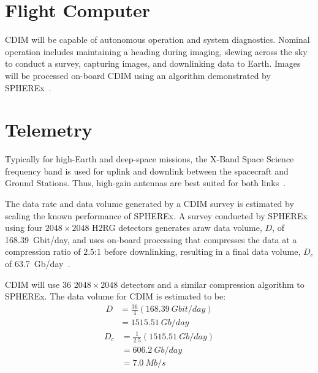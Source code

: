 \documentclass{ws-jai}
\begin{document}
\section{Flight Computer}
CDIM will be capable of autonomous operation and system diagnostics.
Nominal operation includes maintaining a heading during imaging, slewing across the sky to conduct a survey, capturing images, and downlinking data to Earth.
Images will be processed on-board CDIM using an algorithm demonstrated by SPHEREx~\cite{spherexTelemetry2016}.

\section{Telemetry}
\label{sec:telemetry}
Typically for high-Earth and deep-space missions, the X-Band Space Science frequency band is used for uplink and downlink between the spacecraft and Ground Stations.
Thus, high-gain antennas are best suited for both links~\cite{smad2015}.

The data rate and data volume generated by a CDIM survey is estimated by scaling the known performance of SPHEREx.
A survey conducted by SPHEREx using four $2048\times2048$ H2RG detectors generates araw data volume, $D$, of \SI{168.39}{Gbit/day}, and uses on-board processing that compresses the data at a compression ratio of $2.5$:$1$ before downlinking, resulting in a final data volume, $D_c$ of \SI{63.7}{Gb/day}~\cite{spherexTelemetry2016}.

CDIM will use 36 $2048\times2048$ detectors and a similar compression algorithm to SPHEREx.
The data volume for CDIM is estimated to be:
\begin{equation}\label{eq:telemetry-d}
  \begin{split}
    D &= \frac{36}{4} (\SI{168.39}{Gbit/day}) \\
    &= \SI{1515.51}{Gb/day}
  \end{split}
\end{equation}
\begin{equation} \label{eq:telemetry-dc}
  \begin{split}
    D_c &= \frac{1}{2.5}(\SI{1515.51}{Gb/day}) \\
    &= \SI{606.2}{Gb/day} \\
    &= \SI{7.0}{Mb/s}
  \end{split}
\end{equation}
\end{document}
